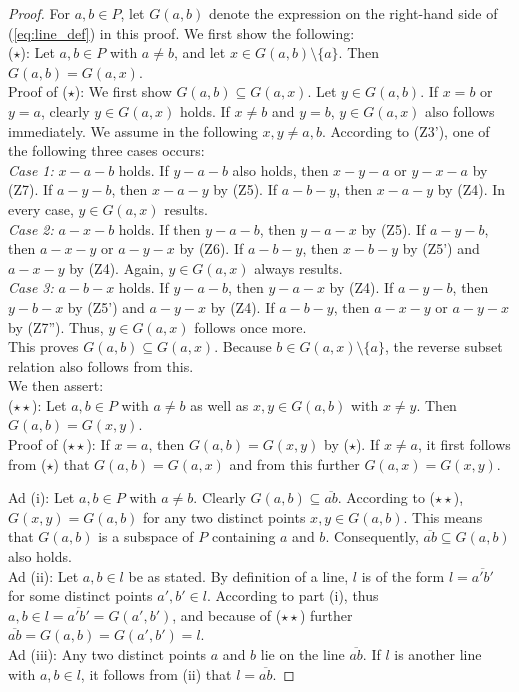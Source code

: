 \documentclass[11pt,a4paper]{article}
\newcommand{\betw}[3]{#1 - #2 - #3}
\newcommand{\lineab}[1]{\overline{#1}}
\begin{document}
\begin{proof}
For $a, b \in P$, let $G(a, b)$ denote the expression on the right-hand side of (\ref{eq:line_def}) in this proof. We first show the following: \\
($\star$): Let $a, b \in P$ with $a \neq b$, and let $x \in G(a, b) \setminus \{a\}$. Then $G(a, b) = G(a, x)$. \\
Proof of ($\star$): We first show $G(a, b) \subseteq G(a, x)$. Let $y \in G(a, b)$. If $x = b$ or $y = a$, clearly $y \in G(a, x)$ holds. If $x \neq b$ and $y = b$, $y \in G(a, x)$ also follows immediately. We assume in the following $x, y \neq a, b$. According to (Z3'), one of the following three cases occurs: \\
\textit{Case 1:} $\betw{x}{a}{b}$ holds. If $\betw{y}{a}{b}$ also holds, then $\betw{x}{y}{a}$ or $\betw{y}{x}{a}$ by (Z7). If $\betw{a}{y}{b}$, then $\betw{x}{a}{y}$ by (Z5). If $\betw{a}{b}{y}$, then $\betw{x}{a}{y}$ by (Z4). In every case, $y \in G(a, x)$ results. \\
\textit{Case 2:} $\betw{a}{x}{b}$ holds. If then $\betw{y}{a}{b}$, then $\betw{y}{a}{x}$ by (Z5). If $\betw{a}{y}{b}$, then $\betw{a}{x}{y}$ or $\betw{a}{y}{x}$ by (Z6). If $\betw{a}{b}{y}$, then $\betw{x}{b}{y}$ by (Z5') and $\betw{a}{x}{y}$ by (Z4). Again, $y \in G(a, x)$ always results. \\
\textit{Case 3:} $\betw{a}{b}{x}$ holds. If $\betw{y}{a}{b}$, then $\betw{y}{a}{x}$ by (Z4). If $\betw{a}{y}{b}$, then $\betw{y}{b}{x}$ by (Z5') and $\betw{a}{y}{x}$ by (Z4). If $\betw{a}{b}{y}$, then $\betw{a}{x}{y}$ or $\betw{a}{y}{x}$ by (Z7''). Thus, $y \in G(a, x)$ follows once more. \\
This proves $G(a, b) \subseteq G(a, x)$. Because $b \in G(a, x) \setminus \{a\}$, the reverse subset relation also follows from this. \\
We then assert: \\
($\star\star$): Let $a, b \in P$ with $a \neq b$ as well as $x, y \in G(a, b)$ with $x \neq y$. Then $G(a, b) = G(x, y)$. \\
Proof of ($\star\star$): If $x = a$, then $G(a, b) = G(x, y)$ by ($\star$). If $x \neq a$, it first follows from ($\star$) that $G(a, b) = G(a, x)$ and from this further $G(a, x) = G(x, y)$.

Ad (i): Let $a, b \in P$ with $a \neq b$. Clearly $G(a, b) \subseteq \lineab{ab}$. According to ($\star\star$), $G(x, y) = G(a, b)$ for any two distinct points $x, y \in G(a, b)$. This means that $G(a, b)$ is a subspace of $P$ containing $a$ and $b$. Consequently, $\lineab{ab} \subseteq G(a, b)$ also holds. \\
Ad (ii): Let $a, b \in l$ be as stated. By definition of a line, $l$ is of the form $l = \lineab{a'b'}$ for some distinct points $a', b' \in l$. According to part (i), thus $a, b \in l = \lineab{a'b'} = G(a', b')$, and because of ($\star\star$) further $\lineab{ab} = G(a, b) = G(a', b') = l$. \\
Ad (iii): Any two distinct points $a$ and $b$ lie on the line $\lineab{ab}$. If $l$ is another line with $a, b \in l$, it follows from (ii) that $l = \lineab{ab}$.
\end{proof}
\end{document}
